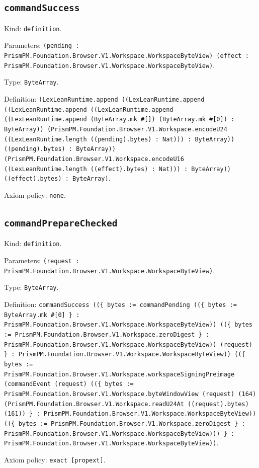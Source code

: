 \documentclass[11pt]{article}
\begin{document}
\subsection*{\texttt{commandSuccess}}
\noindent Kind: \texttt{definition}.\par
\noindent Parameters: \texttt{(pending : PrismPM.Foundation.Browser.V1.Workspace.WorkspaceByteView) (effect : PrismPM.Foundation.Browser.V1.Workspace.WorkspaceByteView)}.\par
\noindent Type: \texttt{ByteArray}.\par
\noindent Definition: \texttt{(LexLeanRuntime.append ((LexLeanRuntime.append ((LexLeanRuntime.append ((LexLeanRuntime.append ((LexLeanRuntime.append (ByteArray.mk \#[]) (ByteArray.mk \#[0]) : ByteArray)) (PrismPM.Foundation.Browser.V1.Workspace.encodeU24 ((LexLeanRuntime.length ((pending).bytes) : Nat))) : ByteArray)) ((pending).bytes) : ByteArray)) (PrismPM.Foundation.Browser.V1.Workspace.encodeU16 ((LexLeanRuntime.length ((effect).bytes) : Nat))) : ByteArray)) ((effect).bytes) : ByteArray)}.\par
\noindent Axiom policy: \texttt{none}.\par
\subsection*{\texttt{commandPrepareChecked}}
\noindent Kind: \texttt{definition}.\par
\noindent Parameters: \texttt{(request : PrismPM.Foundation.Browser.V1.Workspace.WorkspaceByteView)}.\par
\noindent Type: \texttt{ByteArray}.\par
\noindent Definition: \texttt{commandSuccess ((\{ bytes := commandPending ((\{ bytes := ByteArray.mk \#[0] \} : PrismPM.Foundation.Browser.V1.Workspace.WorkspaceByteView)) ((\{ bytes := PrismPM.Foundation.Browser.V1.Workspace.zeroDigest \} : PrismPM.Foundation.Browser.V1.Workspace.WorkspaceByteView)) (request) \} : PrismPM.Foundation.Browser.V1.Workspace.WorkspaceByteView)) ((\{ bytes := PrismPM.Foundation.Browser.V1.Workspace.workspaceSigningPreimage (commandEvent (request) ((\{ bytes := PrismPM.Foundation.Browser.V1.Workspace.byteWindowView (request) (164) (PrismPM.Foundation.Browser.V1.Workspace.readU24At ((request).bytes) (161)) \} : PrismPM.Foundation.Browser.V1.Workspace.WorkspaceByteView)) ((\{ bytes := PrismPM.Foundation.Browser.V1.Workspace.zeroDigest \} : PrismPM.Foundation.Browser.V1.Workspace.WorkspaceByteView))) \} : PrismPM.Foundation.Browser.V1.Workspace.WorkspaceByteView))}.\par
\noindent Axiom policy: \texttt{exact [propext]}.\par
\end{document}
